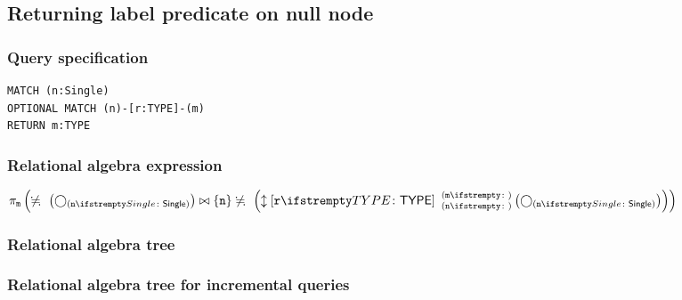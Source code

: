 \subsection{Returning label predicate on null node}

\subsubsection*{Query specification}

\begin{lstlisting}
MATCH (n:Single)
OPTIONAL MATCH (n)-[r:TYPE]-(m)
RETURN m:TYPE
\end{lstlisting}

\subsubsection*{Relational algebra expression}

$\projection{\var{m}} \left(\alldifferent{} \left(\getvertices{n}{Single}\right) \join \{\var{n}\} \alldifferent{} \left(\expandboth{r}{TYPE}{n}{m}{} \left(\getvertices{n}{Single}\right)\right)\right)$

\subsubsection*{Relational algebra tree}


\subsubsection*{Relational algebra tree for incremental queries}


